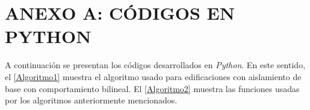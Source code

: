 \section*{ANEXO A: CÓDIGOS EN PYTHON}
{}
A continuación se presentan los códigos desarrollados en \textit{Python}. En este sentido, el \autoref{Algoritmo1} muestra el algoritmo usado para edificaciones con aislamiento de base con comportamiento bilineal. El \autoref{Algoritmo2} muestra las funciones usadas por los algoritmos anteriormente mencionados.

\vspace*{2mm}


	
	
	